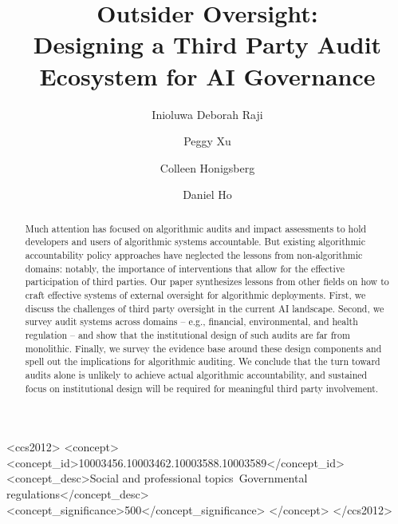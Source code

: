 \documentclass[sigconf]{acmart}
\begin{document}
\title{Outsider Oversight: \\ Designing a Third Party Audit Ecosystem for AI Governance}

\author{Inioluwa Deborah Raji}

\author{Peggy Xu}

\author{Colleen Honigsberg}

\author{Daniel Ho}
\begin{abstract}
Much attention has focused on algorithmic audits and impact assessments to hold developers and users of algorithmic systems accountable. But existing algorithmic accountability policy approaches have neglected the lessons from non-algorithmic domains: notably, the importance of interventions that allow for the effective participation of third parties.
Our paper synthesizes lessons from other fields on how to craft effective systems of external oversight for algorithmic deployments. First, we discuss the challenges of third party oversight in the current AI landscape. Second, we survey audit systems across domains – e.g., financial, environmental, and health regulation – and show that the institutional design of such audits are far from monolithic. 
Finally, we survey the evidence base around these design components and spell out the implications for algorithmic auditing. We conclude that the turn toward audits alone is unlikely to achieve actual algorithmic accountability, and sustained focus on institutional design will be required for meaningful third party involvement.
\end{abstract}


\begin{CCSXML}
<ccs2012>
<concept>
<concept_id>10003456.10003462.10003588.10003589</concept_id>
<concept_desc>Social and professional topics~Governmental regulations</concept_desc>
<concept_significance>500</concept_significance>
</concept>
</ccs2012>
\end{CCSXML}

\end{document}
